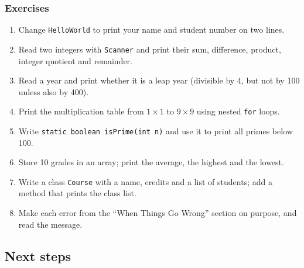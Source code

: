 \documentclass[aspectratio=169,10pt,compress]{beamer}
\begin{document}
\begin{frame}[t,fragile] \frametitle{Exercises}
  \begin{enumerate}\small
    \item Change \texttt{HelloWorld} to print your name and student number on two lines.
    \item Read two integers with \texttt{Scanner} and print their sum, difference, product, integer quotient and remainder.
    \item Read a year and print whether it is a leap year (divisible by 4, but not by 100 unless also by 400).
    \item Print the multiplication table from $1 \times 1$ to $9 \times 9$ using nested \texttt{for} loops.
    \item Write \texttt{static boolean isPrime(int n)} and use it to print all primes below 100.
    \item Store 10 grades in an array; print the average, the highest and the lowest.
    \item Write a class \texttt{Course} with a name, credits and a list of students; add a method that prints the class list.
    \item Make each error from the ``When Things Go Wrong'' section on purpose, and read the message.
  \end{enumerate}
\end{frame}

\subsection[Next]{Next steps}
\end{document}
